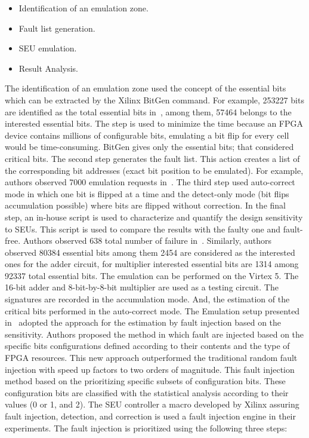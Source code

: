 \begin{itemize}

\item Identification of an emulation zone.
\item Fault list generation.
\item SEU emulation.
\item Result Analysis.

\end{itemize}



The identification of an emulation zone used the concept of the essential bits which can be extracted by the Xilinx BitGen command. For example, 253227 bits are identified as the total essential bits in~\cite{hobeika2013flight}, among them, 57464 belongs to the interested essential bits. The step is used to minimize the time because an FPGA device contains millions of configurable bits, emulating a bit flip for every cell would be time-consuming. BitGen gives only the essential bits; that
considered critical bits. The second step generates the fault list. This action creates a list of the corresponding bit addresses (exact bit position to be emulated).  For example, authors observed 7000 emulation requests in~\cite{hobeika2013flight}.  The third step used auto-correct mode in which one bit is flipped at a time and the detect-only mode  (bit flips accumulation possible) where bits are flipped without correction. In the final step, an in-house script is used to characterize and quantify the design sensitivity to SEUs. This script is used to compare the results with the faulty one and fault-free. Authors observed 638 total number of failure in~\cite{hobeika2013flight}. Similarly, authors observed 80384 essential bits among them 2454 are considered as the interested ones for the adder circuit, for multiplier interested essential bits are 1314 among 92337 total essential bits.
The emulation can be performed on the Virtex 5. The 16-bit adder and  8-bit-by-8-bit multiplier are used as a testing circuit. The signatures are recorded in the accumulation mode. And, the estimation of the critical bits performed in the auto-correct mode.
The Emulation setup presented in~\cite{souari2015optimization} adopted the approach for the estimation by fault injection based on the sensitivity. Authors proposed the method in which fault are injected based on the specific bits configurations defined according to their contents and the type of FPGA resources. This new approach outperformed the traditional random fault injection with speed up factors to two orders of magnitude. This fault injection method based on the prioritizing specific subsets of configuration bits. These configuration bits are classified with the statistical analysis according to their values (0 or 1, and 2). The SEU controller a macro developed by Xilinx assuring fault injection, detection, and correction is used a fault injection engine in their experiments. The fault injection is prioritized using the following three steps:


